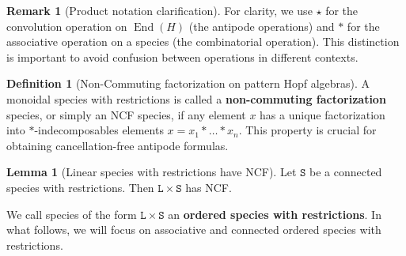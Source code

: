 \documentclass[12pt, reqno]{amsart}
\theoremstyle{definition}
\newtheorem{lm}[thm]{Lemma}
\newtheorem{defin}[thm]{Definition}
\newtheorem{rem}[thm]{Remark}
\DeclareMathOperator{\End}{\mathrm{End}}
\begin{document}
\begin{rem}[Product notation clarification]
For clarity, we use $\star$ for the convolution operation on $\End (H)$ (the antipode operations) and $\ast $ for the associative operation on a species (the combinatorial operation). This distinction is important to avoid confusion between operations in different contexts.
\end{rem}

\begin{defin}[Non-Commuting factorization on pattern Hopf algebras]\label{defin:ncf}
A monoidal species with restrictions is called a \textbf{non-commuting factorization} species, or simply an NCF species, if any element $x$ has a unique factorization into $\ast$-indecomposables elements $x = x_1 \ast \dots \ast x_n$. This property is crucial for obtaining cancellation-free antipode formulas.
\end{defin}


\begin{lm}[Linear species with restrictions have NCF]
Let $\mathtt{S}$ be a connected species with restrictions.
Then $\mathtt{L} \times \mathtt{S}$ has NCF.
\end{lm}

We call species of the form $\mathtt{L} \times \mathtt{S}$ an \textbf{ordered species with restrictions}. In what follows, we will focus on associative and connected ordered species with restrictions.
\end{document}
